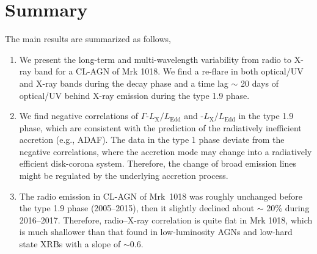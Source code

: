 \section{Summary}
\label{sec:conclusion}
The main results are summarized as follows,
\begin{enumerate}

\item We present the long-term and multi-wavelength variability from radio to X-ray band for a CL-AGN of Mrk 1018. We find a re-flare in both optical/UV and X-ray bands during the decay phase and a time lag $\sim$ 20 days of optical/UV behind X-ray emission during the type 1.9 phase.    

\item We find negative correlations of $\Gamma$-$L_\mathrm{X}/L_\mathrm{Edd}$ and \alphaox-$L_\mathrm{X}/L_\mathrm{Edd}$ in the type 1.9 phase, which are consistent with the prediction of the radiatively inefficient accretion (e.g., ADAF). The data in the type 1 phase deviate from the negative correlations, where the accretion mode may change into a radiatively efficient disk-corona system. Therefore, the change of broad emission lines might be regulated by the underlying accretion process. 

\item The radio emission in CL-AGN of Mrk~1018 was roughly unchanged before the type 1.9 phase (2005--2015), then it slightly declined about $\sim$ 20\% during 2016--2017. Therefore, radio--X-ray correlation is quite flat in Mrk 1018, which is much shallower than that found in low-luminosity AGNs and low-hard state XRBs with a slope of $\sim 0.6$. 

\end{enumerate}

 